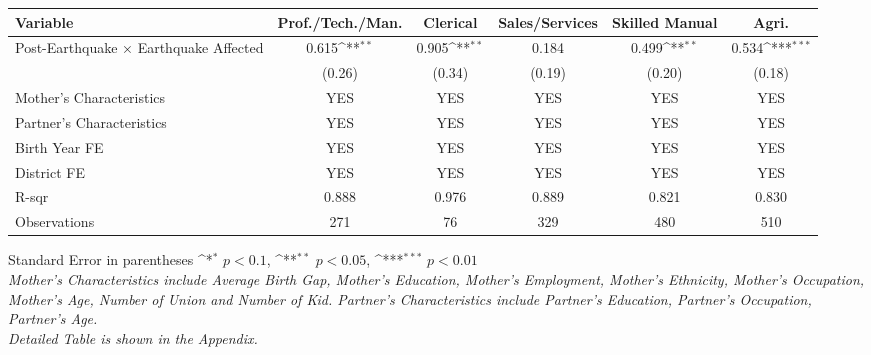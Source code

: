 \def\sym#1{\ifmmode^{#1}\else\(^{#1}\)\fi}
\renewcommand{\arraystretch}{1.4}
\small
\setlength{\tabcolsep}{6pt}

\begin{flushleft}
\begin{tabular}{@{}p{4cm}*{5}{c}@{}}
\hline\hline
Variable & Prof./Tech./Man. & Clerical & Sales/Services & Skilled Manual & Agri. \\
\hline
Post-Earthquake × Earthquake Affected & 0.615\sym{**} & 0.905\sym{**} & 0.184 & 0.499\sym{**} & 0.534\sym{***} \\
                                      & (0.26)        & (0.34)        & (0.19) & (0.20)        & (0.18)         \\
\hline
Mother's Characteristics              & YES           & YES           & YES    & YES           & YES            \\
Partner's Characteristics             & YES           & YES           & YES    & YES           & YES            \\
\hline
Birth Year FE                         & YES           & YES           & YES    & YES           & YES            \\
District FE                           & YES           & YES           & YES    & YES           & YES            \\
R-sqr                                 & 0.888         & 0.976         & 0.889  & 0.821         & 0.830          \\
Observations                          & 271           & 76            & 329    & 480           & 510            \\
\hline\hline
\end{tabular}

\vspace{4pt}
\noindent\footnotesize
Standard Error in parentheses \sym{*} \(p<0.1\), \sym{**} \(p<0.05\), \sym{***} \(p<0.01\)\\
\textit{Mother’s Characteristics include Average Birth Gap, Mother’s Education, Mother’s Employment, Mother’s Ethnicity, Mother’s Occupation, Mother’s Age, Number of Union and Number of Kid. Partner’s Characteristics include Partner’s Education, Partner’s Occupation, Partner’s Age.}\\
\textit{Detailed Table is shown in the Appendix.}
\end{flushleft}
